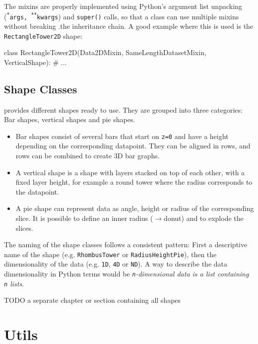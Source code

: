 The mixins are properly implemented using Python's argument list unpacking
(\texttt{\textsuperscript{*}args, \textsuperscript{**}kwargs}) and
\texttt{super()} calls, so that a class can use multiple mixins without breaking
.the inheritance chain. A good example where this is used is the
\texttt{RectangleTower2D} shape:

\vspace{.5\baselineskip}

\begin{pythoncode}
class RectangleTower2D(Data2DMixin,
    SameLengthDatasetMixin, VerticalShape):
    # ...
\end{pythoncode}

\subsection{Shape Classes}

\tangible{} provides different shapes ready to use. They are grouped into three
categories: Bar shapes, vertical shapes and  pie shapes.

\begin{itemize}
	\item Bar shapes consist of several bars that start on \texttt{z=0} and have a
		height depending on the corresponding datapoint. They can be aligned in
		rows, and rows can be combined to create 3D bar graphs.
	\item A vertical shape is a shape with layers stacked on top of each other,
		with a fixed layer height, for example a round tower where the radius
		corresponds to the datapoint.
	\item A pie shape can represent data as angle, height or radius of the
		corresponding slice. It is possible to define an inner radius ($\rightarrow$donut) and
		to explode the slices.
\end{itemize}

\noindent The naming of the shape classes follows a consistent pattern: First a
descriptive name of the shape (e.g. \texttt{RhombusTower} or
\texttt{RadiusHeightPie}), then the dimensionality of the data (e.g.
\texttt{1D}, \texttt{4D} or \texttt{ND}). A way to describe the data
dimensionality in Python terms would be \emph{\texttt{n}-dimensional data is a
list containing \texttt{n} lists}.

TODO a separate chapter or section containing all shapes


\section{Utils}\label{sec:utils}
